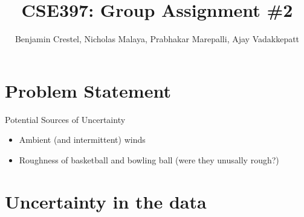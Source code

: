 \documentclass{article}
\title{\bf{CSE397: Group Assignment \#2}}
\author{Benjamin Crestel, Nicholas Malaya, Prabhakar Marepalli, Ajay Vadakkepatt}
\date{}
\begin{document}
\maketitle

\newpage
\section{Problem Statement}

Potential Sources of Uncertainty
\begin{itemize}
\item Ambient (and intermittent) winds
\item Roughness of basketball and bowling ball (were they unusally rough?)
\end{itemize}

\section{Uncertainty in the data}
\end{document}
